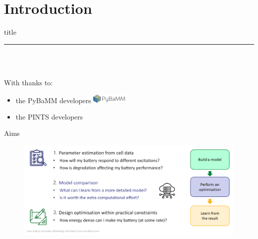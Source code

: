 \documentclass[aspectratio=169]{beamer} %
\begin{document}
\section{Introduction}
\begin{frame}[plain]
    \centering
    \begin{beamercolorbox}[sep=8pt,center,shadow=true,rounded=true]{title}
    \insertsectionhead\par%
    \color{oxfordblue}\noindent\rule{10cm}{1pt} \\
    \LARGE{\faBatteryThreeQuarters} \\
    \end{beamercolorbox}
    \vspace{6mm} \normalsize
    \begin{flushleft}
        With thanks to:
    \end{flushleft}
    \begin{itemize}
        \item the PyBaMM developers \href{https://github.com/pybop-team/PyBOP}{\includegraphics[height=1.2em]{Theme/Logos/PyBaMM_logo.png}}
        \item the PINTS developers \href{https://github.com/pints-team/pints}{\faGithub}
    \end{itemize}
\end{frame}


\begin{frame}{Aims}
    \vspace{-6mm}
    \begin{figure}
        \centering
        \includegraphics[width=\textwidth]{Images/ProblemTypes.png}
    \end{figure}
\end{frame}
\end{document}
